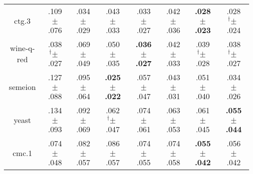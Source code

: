 \begin{tabular}{|c|ccccccc|}
ctg.3 & .109$^{\phantom{\dag}}\pm^{\phantom{\dag}}$.076\cellcolor{red!40} & .034$^{\phantom{\dag}}\pm^{\phantom{\dag}}$.029\cellcolor{green!34} & .043$^{\phantom{\dag}}\pm^{\phantom{\dag}}$.033\cellcolor{green!25} & .033$^{\phantom{\dag}}\pm^{\phantom{\dag}}$.027\cellcolor{green!35} & .042$^{\phantom{\dag}}\pm^{\phantom{\dag}}$.036\cellcolor{green!25} & \textbf{.028$^{\phantom{\dag}}\pm^{\phantom{\dag}}$.023}\cellcolor{green!40} & .028$^{\dag}\pm^{\phantom{\dag}}$.024\cellcolor{green!39} \\
wine-q-red & .038$^{\dag}\pm^{\phantom{\dag}}$.027\cellcolor{green!34} & .069$^{\phantom{\dag}}\pm^{\phantom{\dag}}$.049\cellcolor{red!40} & .050$^{\phantom{\dag}}\pm^{\phantom{\dag}}$.035\cellcolor{green!7} & \textbf{.036$^{\phantom{\dag}}\pm^{\phantom{\dag}}$.027}\cellcolor{green!40} & .042$^{\phantom{\dag}}\pm^{\phantom{\dag}}$.033\cellcolor{green!24} & .039$^{\dag}\pm^{\phantom{\dag}}$.028\cellcolor{green!33} & .038$^{\dag}\pm^{\phantom{\dag}}$.027\cellcolor{green!36} \\
semeion & .127$^{\phantom{\dag}}\pm^{\phantom{\dag}}$.088\cellcolor{red!40} & .095$^{\phantom{\dag}}\pm^{\phantom{\dag}}$.064\cellcolor{red!15} & \textbf{.025$^{\phantom{\dag}}\pm^{\phantom{\dag}}$.022}\cellcolor{green!40} & .057$^{\phantom{\dag}}\pm^{\phantom{\dag}}$.047\cellcolor{green!14} & .043$^{\phantom{\dag}}\pm^{\phantom{\dag}}$.031\cellcolor{green!26} & .051$^{\phantom{\dag}}\pm^{\phantom{\dag}}$.040\cellcolor{green!19} & .034$^{\phantom{\dag}}\pm^{\phantom{\dag}}$.026\cellcolor{green!33} \\
yeast & .134$^{\phantom{\dag}}\pm^{\phantom{\dag}}$.093\cellcolor{red!40} & .092$^{\phantom{\dag}}\pm^{\phantom{\dag}}$.069\cellcolor{green!2} & .062$^{\dag}\pm^{\phantom{\dag}}$.047\cellcolor{green!33} & .074$^{\phantom{\dag}}\pm^{\phantom{\dag}}$.061\cellcolor{green!21} & .063$^{\phantom{\dag}}\pm^{\phantom{\dag}}$.053\cellcolor{green!32} & .061$^{\phantom{\dag}}\pm^{\phantom{\dag}}$.045\cellcolor{green!34} & \textbf{.055$^{\phantom{\dag}}\pm^{\phantom{\dag}}$.044}\cellcolor{green!40} \\
cmc.1 & .074$^{\phantom{\dag}}\pm^{\phantom{\dag}}$.048\cellcolor{red!9} & .082$^{\phantom{\dag}}\pm^{\phantom{\dag}}$.057\cellcolor{red!30} & .086$^{\phantom{\dag}}\pm^{\phantom{\dag}}$.057\cellcolor{red!40} & .074$^{\phantom{\dag}}\pm^{\phantom{\dag}}$.055\cellcolor{red!8} & .074$^{\phantom{\dag}}\pm^{\phantom{\dag}}$.058\cellcolor{red!9} & \textbf{.055$^{\phantom{\dag}}\pm^{\phantom{\dag}}$.042}\cellcolor{green!40} & .056$^{\phantom{\dag}}\pm^{\phantom{\dag}}$.042\cellcolor{green!36} \\

\end{tabular}
